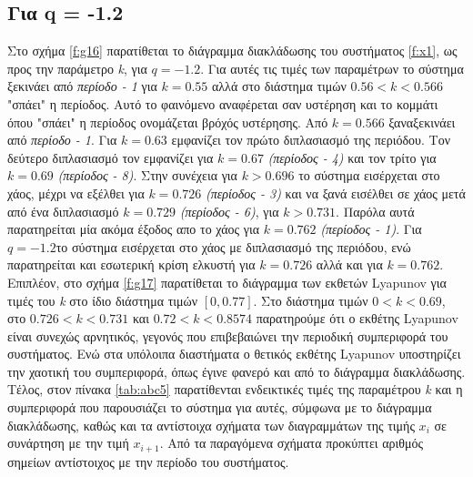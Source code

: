 \subsection{Για q = -1.2}
Στο σχήμα \ref{f:g16} παρατίθεται το διάγραμμα διακλάδωσης του συστήματος \ref{f:x1}, ως προς την παράμετρο \emph{k}, για $q =- 1.2$. Για αυτές τις τιμές των παραμέτρων το σύστημα ξεκινάει από \emph{περίοδο - 1} για $k = 0.55$ αλλά στο διάστημα τιμών $0.56<k<0.566$ "σπάει" η περίοδος. Αυτό το φαινόμενο αναφέρεται σαν υστέρηση και το κομμάτι όπου "σπάει" η περίοδος ονομάζεται βρόχός υστέρησης. Από $k=0.566$ ξαναξεκινάει από \emph{περίοδο - 1}. Για  $k = 0.63$ εμφανίζει τον πρώτο διπλασιασμό της περιόδου. Τον δεύτερο διπλασιασμό τον εμφανίζει για $k=0.67$ \emph{(περίοδος -   4)} και τον τρίτο για $k=0.69$ \emph{(περίοδος -   8)}. Στην συνέχεια για $k>0.696$ το σύστημα εισέρχεται στο χάος, μέχρι να εξέλθει  για $k=0.726$ \emph{(περίοδος -   3)} και να ξανά εισέλθει σε χάος μετά από ένα διπλασιασμό $k=0.729$ \emph{(περίοδος -   6)}, για $k>0.731$. Παρόλα αυτά παρατηρείται μία ακόμα έξοδος απο το χάος για $k=0.762$ \emph{(περίοδος -   1)}.
Για $q=-1.2$το σύστημα εισέρχεται στο χάος με διπλασιασμό της περιόδου, ενώ παρατηρείται και εσωτερική κρίση ελκυστή για $k=0.726$ αλλά και για $k=0.762$.
Επιπλέον, στο σχήμα \ref{f:g17} παρατίθεται το διάγραμμα των εκθετών Lyapunov για τιμές του \emph{k} στο ίδιο διάστημα τιμών $[0, 0.77]$.  Στο διάστημα τιμών  $ 0<k<0.69$, στο $0.726<k<0.731$ και $0.72<k<0.8574$ παρατηρούμε ότι ο εκθέτης Lyapunov είναι συνεχώς αρνητικός, γεγονός που επιβεβαιώνει την περιοδική συμπεριφορά του συστήματος. Ενώ στα υπόλοιπα διαστήματα ο θετικός εκθέτης Lyapunov υποστηρίζει την χαοτική του συμπεριφορά, όπως έγινε φανερό και από το διάγραμμα διακλάδωσης.
Τέλος, στον πίνακα \ref{tab:abc5} παρατίθενται ενδεικτικές τιμές της παραμέτρου \emph{k} και η συμπεριφορά που παρουσιάζει το σύστημα για αυτές, σύμφωνα με το διάγραμμα διακλάδωσης, καθώς και τα αντίστοιχα σχήματα των διαγραμμάτων της τιμής \(x_i\) σε συνάρτηση με την τιμή \(x_{i+1}\). Από τα παραγόμενα σχήματα προκύπτει αριθμός σημείων αντίστοιχος με την περίοδο του συστήματος.
